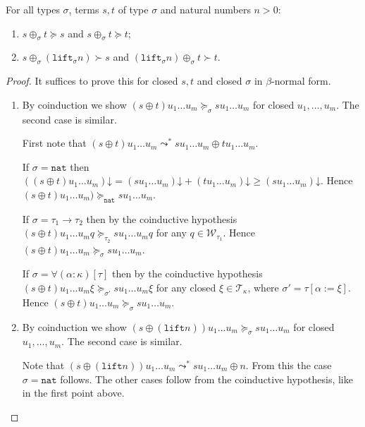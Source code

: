 \documentclass[runningheads,a4paper]{llncs}
\newcommand{\World}{\mathcal{W}}
\newcommand{\arrtype}{\rightarrow}
\newcommand{\subst}[2]{#1:=#2}
\newcommand{\Tc}{\mathcal{T}}
\newcommand{\nat}{\mathtt{nat}}
\newcommand{\lift}{\mathtt{lift}}
\newcommand{\da}{\mathord{\downarrow}}
\begin{document}
\begin{lemma}\label{lem:plusparts}
For all types $\sigma$, terms $s,t$ of type $\sigma$ and natural
numbers $n > 0$:
\begin{enumerate}
\item $s \oplus_{\sigma} t \succeq s$ and $s \oplus_{\sigma} t \succeq
  t$;
\item $s \oplus_{\sigma} (\lift_{\sigma} n) \succ s$ and
  $(\lift_{\sigma} n) \oplus_{\sigma} t \succ t$.
\end{enumerate}
\end{lemma}

\begin{proof}
  It suffices to prove this for closed $s,t$ and closed $\sigma$ in
  $\beta$-normal form.
  \begin{enumerate}
  \item By coinduction we show $(s \oplus t) u_1 \ldots u_m
    \succeq_\sigma s u_1 \ldots u_m$ for closed $u_1,\ldots,u_m$. The
    second case is similar.

    First note that $(s \oplus t) u_1 \ldots u_m \leadsto^* s u_1
    \ldots u_m \oplus t u_1 \ldots u_m$.

    If $\sigma = \nat$ then $((s \oplus t) u_1 \ldots u_m)\da = (s u_1
    \ldots u_m)\da + (t u_1 \ldots u_m)\da \ge (s u_1 \ldots
    u_m)\da$. Hence $(s \oplus t) u_1 \ldots u_m) \succeq_\nat s u_1
    \ldots u_m$.

    If $\sigma = \tau_1\arrtype\tau_2$ then by the coinductive
    hypothesis $(s \oplus t) u_1 \ldots u_m q \succeq_{\tau_2} s u_1
    \ldots u_m q$ for any $q \in \World_{\tau_1}$. Hence $(s \oplus t)
    u_1 \ldots u_m \succeq_\sigma s u_1 \ldots u_m$.

    If $\sigma = \forall(\alpha:\kappa)[\tau]$ then by the coinductive
    hypothesis $(s \oplus t) u_1 \ldots u_m \xi \succeq_{\sigma'} s
    u_1 \ldots u_m \xi$ for any closed $\xi \in \Tc_\kappa$, where
    $\sigma' = \tau[\subst{\alpha}{\xi}]$. Hence $(s \oplus t) u_1
    \ldots u_m \succeq_\sigma s u_1 \ldots u_m$.
  \item By coinduction we show $(s \oplus (\lift n)) u_1 \ldots u_m
    \succeq_\sigma s u_1 \ldots u_m$ for closed $u_1,\ldots,u_m$. The
    second case is similar.

    Note that $(s \oplus (\lift n)) u_1 \ldots u_m \leadsto^* s u_1
    \ldots u_m \oplus n$. From this the case $\sigma=\nat$
    follows. The other cases follow from the coinductive hypothesis,
    like in the first point above.
  \end{enumerate}
\end{proof}
\end{document}

